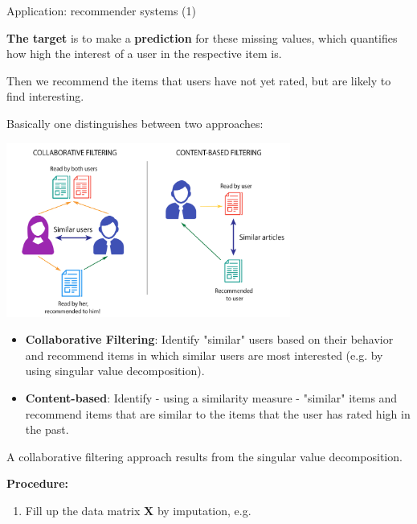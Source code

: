 \documentclass[11pt,compress,t,notes=noshow, xcolor=table]{beamer}
\begin{document}
\begin{vbframe}{Application: recommender systems (1)}
\lz

\textbf{The target} is to make a \textbf{prediction} for these missing values, which quantifies how high the interest of a user in the respective item is.

\lz

Then we recommend the items that users have not yet rated, but are likely to find interesting.

\framebreak

Basically one distinguishes between two approaches:

\begin{center}
	\includegraphics[width = 0.7\textwidth]{figure_man/recommender.png}
\end{center}

\framebreak

\begin{itemize}
\item \textbf{Collaborative Filtering}: Identify "similar" users based on their behavior and recommend items in which similar users are most interested (e.g. by using singular value decomposition).
\item \textbf{Content-based}: Identify - using a similarity measure - "similar" items and recommend items that are similar to the items that the user has rated high in the past.
\end{itemize}

\framebreak

A collaborative filtering approach results from the singular value decomposition.

\textbf{Procedure:}

\begin{enumerate}
\item Fill up the data matrix $\mathbf{X}$ by imputation, e.g.


\end{enumerate}
\end{vbframe}
\end{document}
